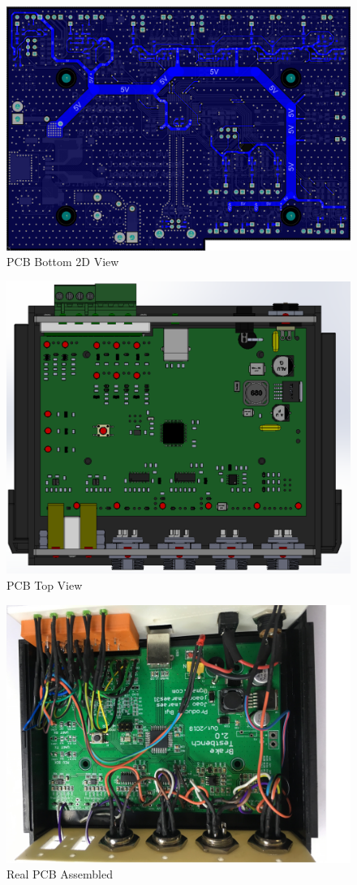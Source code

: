 		\begin{figure}[htbp]
			\centering
			\includegraphics[width=.8\textwidth]{figuras/fig-pcb-design-bottom}
			\caption{PCB Bottom 2D View}
			\label{fig:pcb-design-bottom}
		\end{figure}

		\begin{figure}[htbp]
			\centering
			\includegraphics[width=.8\textwidth]{figuras/fig-pcb-print-3d}
			\caption{PCB Top View}
			\label{fig:pcb-print-top}
		\end{figure}

		\begin{figure}[htbp]
			\centering
			\includegraphics[width=.8\textwidth,angle =180 ]{figuras/fig-pcb-real}
			\caption{Real PCB Assembled}
			\label{fig-pcb-real}
		\end{figure}